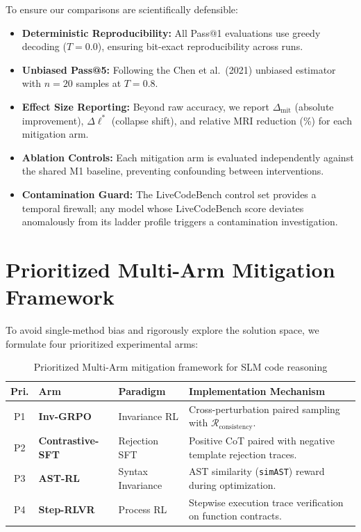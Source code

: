 \documentclass[12pt, a4paper]{article}
\begin{document}
To ensure our comparisons are scientifically defensible:

\begin{itemize}[leftmargin=1.5em, itemsep=4pt]
  \item \textbf{Deterministic Reproducibility:} All Pass@1 evaluations use greedy decoding ($T=0.0$), ensuring bit-exact reproducibility across runs.
  \item \textbf{Unbiased Pass@5:} Following the Chen et al.\ (2021) unbiased estimator with $n=20$ samples at $T=0.8$.
  \item \textbf{Effect Size Reporting:} Beyond raw accuracy, we report $\Delta_{\text{mit}}$ (absolute improvement), $\Delta\ell^*$ (collapse shift), and relative MRI reduction (\%) for each mitigation arm.
  \item \textbf{Ablation Controls:} Each mitigation arm is evaluated independently against the shared M1 baseline, preventing confounding between interventions.
  \item \textbf{Contamination Guard:} The LiveCodeBench control set provides a temporal firewall; any model whose LiveCodeBench score deviates anomalously from its ladder profile triggers a contamination investigation.
\end{itemize}

\section{Prioritized Multi-Arm Mitigation Framework}

To avoid single-method bias and rigorously explore the solution space, we formulate four prioritized experimental arms:

\begin{table}[ht!]
\centering
\caption{Prioritized Multi-Arm mitigation framework for SLM code reasoning}
\label{tab:mitigation_arms}
\renewcommand{\arraystretch}{1.3}
{\small
\begin{tabularx}{\textwidth}{c l l X}
\toprule
\textbf{Pri.} & \textbf{Arm} & \textbf{Paradigm} & \textbf{Implementation Mechanism} \\
\midrule
P1 & \textbf{Inv-GRPO} & Invariance RL & Cross-perturbation paired sampling with $\mathcal{R}_{\text{consistency}}$. \\
P2 & \textbf{Contrastive-SFT} & Rejection SFT & Positive CoT paired with negative template rejection traces. \\
P3 & \textbf{AST-RL} & Syntax Invariance & AST similarity (\texttt{simAST}) reward during optimization. \\
P4 & \textbf{Step-RLVR} & Process RL & Stepwise execution trace verification on function contracts. \\
\bottomrule
\end{tabularx}
}
\end{table}
\end{document}
